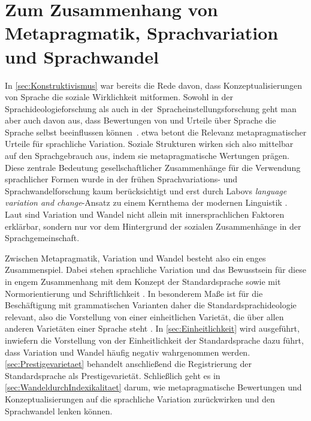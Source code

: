\section[Zusammenhang von Metapragmatik, Sprachvariation und Sprachwandel]{Zum Zusammenhang von Metapragmatik, Sprachvariation und Sprachwandel}
\label{sec:MetapragmatikVariationWandel}
In \autoref{sec:Konstruktivismus} war bereits die Rede davon, dass Konzeptualisierungen von Sprache die soziale Wirklichkeit mitformen. 
Sowohl in der Sprachideologieforschung als auch in der~Spracheinstellungs\-forschung geht man aber auch davon aus, dass Bewertungen von und Urteile über Sprache die Sprache selbst beeinflussen k{\"o}nnen~\citep[s.][xxiv]{Preston.1999b}. 
\citet[45]{Preston2004} etwa betont die Relevanz metapragmatischer Urteile für sprachliche Variation.
Soziale Strukturen wirken sich also mittelbar auf den Sprachgebrauch aus, indem sie metapragmatische Wertungen prägen. 
Diese zentrale Bedeutung gesellschaftlicher Zusammenhänge für die Verwendung sprachlicher Formen wurde in der frühen Sprachvariations- und Sprachwandelforschung kaum berücksichtigt und erst durch Labovs \textit{language variation and change}-Ansatz zu einem Kernthema der modernen Linguistik \citep[s.][25]{Hazen.2011}.
Laut \citet[75]{Labov.2006} sind Variation und Wandel nicht allein mit innersprachlichen Faktoren erklärbar, sondern nur vor dem Hintergrund der sozialen Zusammenhänge in der Sprachgemeinschaft.

Zwischen Metapragmatik, Variation und Wandel besteht also ein enges Zusammenspiel. 
Dabei stehen sprachliche Variation und das Bewusstsein f{\"u}r diese in engem Zusammenhang mit dem Konzept der Standardsprache sowie mit Normorientierung und Schriftlichkeit \citep[s.][325]{Langer.}. 
In besonderem Maße ist für die Beschäftigung mit grammatischen Varianten daher die Standardsprachideologie relevant, also die Vorstellung von einer einheitlichen Varietät, die über allen anderen Varietäten einer Sprache steht \citep[s.][]{Milroy2001}.
In \autoref{sec:Einheitlichkeit} wird ausgeführt, inwiefern die Vorstellung von der Einheitlichkeit der Standardsprache dazu führt, dass Variation und Wandel häufig negativ wahrgenommen werden.
\autoref{sec:Prestigevarietaet} behandelt anschließend die Registrierung der Standardsprache als Prestigevarietät. 
Schließlich geht es in \autoref{sec:WandeldurchIndexikalitaet} darum, wie metapragmatische Bewertungen und Konzeptualisierungen auf die sprachliche Variation zurückwirken und den Sprachwandel lenken können. 
